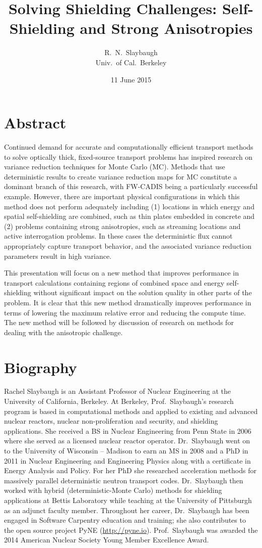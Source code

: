 \documentclass[12pt]{article}
\title{Solving Shielding Challenges: Self-Shielding and Strong Anisotropies}
\author{R.\ N.\ Slaybaugh \\ Univ.\ of Cal.\ Berkeley}
\date{11 June 2015}
\begin{document}
\maketitle

\section*{Abstract}

Continued demand for accurate and computationally efficient transport methods to solve optically thick, fixed-source transport problems has inspired research on variance reduction techniques for Monte Carlo (MC). Methods that use deterministic results to create variance reduction maps for MC constitute a dominant branch of this research, with FW-CADIS being a particularly successful example. However, there are important physical configurations in which this method does not perform adequately including (1) locations in which energy and spatial self-shielding are combined, such as thin plates embedded in concrete and (2) problems containing strong anisotropies, such as streaming locations and active interrogation problems. In these cases the deterministic flux cannot appropriately capture transport behavior, and the associated variance reduction parameters result in high variance. 

This presentation will focus on a new method that improves performance in transport calculations containing regions of combined space and energy self-shielding without significant impact on the solution quality in other parts of the problem. It is clear that this new method dramatically improves performance in terms of lowering the maximum relative error and reducing the compute time. The new method will be followed by discussion of research on methods for dealing with the anisotropic challenge.

\section*{Biography}
Rachel Slaybaugh is an Assistant Professor of Nuclear Engineering at the University of California, Berkeley. At Berkeley, Prof.\ Slaybaugh's research program is based in computational methods and applied to existing and advanced nuclear reactors, nuclear non-proliferation and security, and shielding applications. She received a BS in Nuclear Engineering from Penn State in 2006 where she served as a licensed nuclear reactor operator. Dr.\ Slaybaugh went on to the University of Wisconsin -- Madison to earn an MS in 2008 and a PhD in 2011 in Nuclear Engineering and Engineering Physics along with a certificate in Energy Analysis and Policy. For her PhD she researched acceleration methods for massively parallel deterministic neutron transport codes. Dr.\ Slaybaugh then worked with hybrid (deterministic-Monte Carlo) methods for shielding applications at Bettis Laboratory while teaching at the University of Pittsburgh as an adjunct faculty member. Throughout her career, Dr.\ Slaybaugh has been engaged in Software Carpentry education and training; she also contributes to the open source project PyNE (\href{http://pyne.io}{http://pyne.io}). Prof.\ Slaybaugh was awarded the 2014 American Nuclear Society Young Member Excellence Award.
\end{document}
